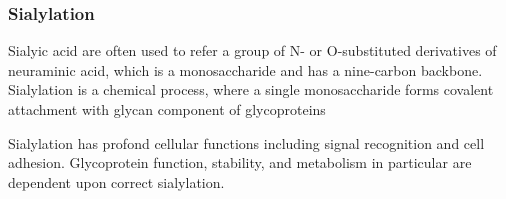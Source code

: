 \subsubsection {Sialylation}
Sialyic acid are often used to refer a group of N- or O-substituted derivatives of neuraminic acid, which is a monosaccharide and has a nine-carbon backbone.~\cite{Vocadlo_2009} Sialylation is a chemical process, where a single monosaccharide forms covalent attachment with glycan component of glycoproteins

Sialylation has profond cellular functions including signal recognition and cell adhesion. Glycoprotein function, stability, and metabolism in particular are dependent upon correct sialylation.